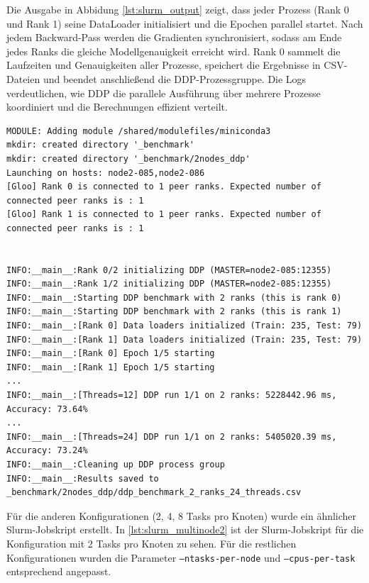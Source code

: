 \documentclass{article}
\begin{document}
Die Ausgabe in Abbidung \ref{lst:slurm_output} zeigt, dass jeder Prozess (Rank 0 und Rank 1) seine DataLoader initialisiert und die Epochen parallel startet. 
Nach jedem Backward-Pass werden die Gradienten synchronisiert, sodass am Ende jedes Ranks die gleiche Modellgenauigkeit erreicht wird. 
Rank 0 sammelt die Laufzeiten und Genauigkeiten aller Prozesse, speichert die Ergebnisse in CSV-Dateien und beendet anschließend die DDP-Prozessgruppe. 
Die Logs verdeutlichen, wie DDP die parallele Ausführung über mehrere Prozesse koordiniert und die Berechnungen effizient verteilt.
\begin{lstlisting}[basicstyle=\ttfamily\small, caption={Beispielausgabe des DDP-Slurm-Jobs}, label={lst:slurm_output}]
MODULE: Adding module /shared/modulefiles/miniconda3
mkdir: created directory '_benchmark'
mkdir: created directory '_benchmark/2nodes_ddp'
Launching on hosts: node2-085,node2-086
[Gloo] Rank 0 is connected to 1 peer ranks. Expected number of connected peer ranks is : 1
[Gloo] Rank 1 is connected to 1 peer ranks. Expected number of connected peer ranks is : 1
    

INFO:__main__:Rank 0/2 initializing DDP (MASTER=node2-085:12355)
INFO:__main__:Rank 1/2 initializing DDP (MASTER=node2-085:12355)
INFO:__main__:Starting DDP benchmark with 2 ranks (this is rank 0)
INFO:__main__:Starting DDP benchmark with 2 ranks (this is rank 1)
INFO:__main__:[Rank 0] Data loaders initialized (Train: 235, Test: 79)
INFO:__main__:[Rank 1] Data loaders initialized (Train: 235, Test: 79)
INFO:__main__:[Rank 0] Epoch 1/5 starting
INFO:__main__:[Rank 1] Epoch 1/5 starting
...
INFO:__main__:[Threads=12] DDP run 1/1 on 2 ranks: 5228442.96 ms, Accuracy: 73.64%
...
INFO:__main__:[Threads=24] DDP run 1/1 on 2 ranks: 5405020.39 ms, Accuracy: 73.24%
INFO:__main__:Cleaning up DDP process group
INFO:__main__:Results saved to _benchmark/2nodes_ddp/ddp_benchmark_2_ranks_24_threads.csv
\end{lstlisting}

Für die anderen Konfigurationen (2, 4, 8 Tasks pro Knoten) wurde ein ähnlicher Slurm-Jobskript erstellt. In \ref{lst:slurm_multinode2}
ist der Slurm-Jobskript für die Konfiguration mit 2 Tasks pro Knoten zu sehen. Für die restlichen Konfigurationen wurden die Parameter \texttt{--ntasks-per-node} und \texttt{--cpus-per-task} entsprechend angepasst.
\end{document}
